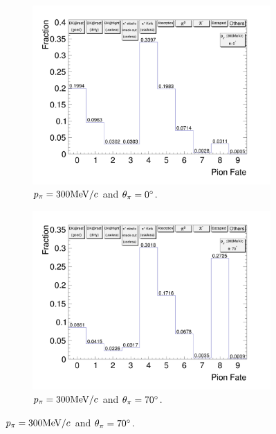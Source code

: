\begin{figure}[t]
\begin{subfigure}{\dbfigwid\textwidth}
               \end{subfigure}
              \\
               \begin{subfigure}{\dbfigwid\textwidth}
                    \includegraphics[width=\textwidth]{figures/sel/pion_fate_300_0.png}
                    \caption{$p_{\pi}=300\textrm{MeV}/c$ and $\theta_{\pi}=0^\circ$.}
                    \label{subfig:pi-fate-300-0}
               \end{subfigure}
               \begin{subfigure}{\dbfigwid\textwidth}
                    \includegraphics[width=\textwidth]{figures/sel/pion_fate_300_70.png}
                    \caption{$p_{\pi}=300\textrm{MeV}/c$ and $\theta_{\pi}=70^\circ$.}

\end{subfigure}
\end{figure}
